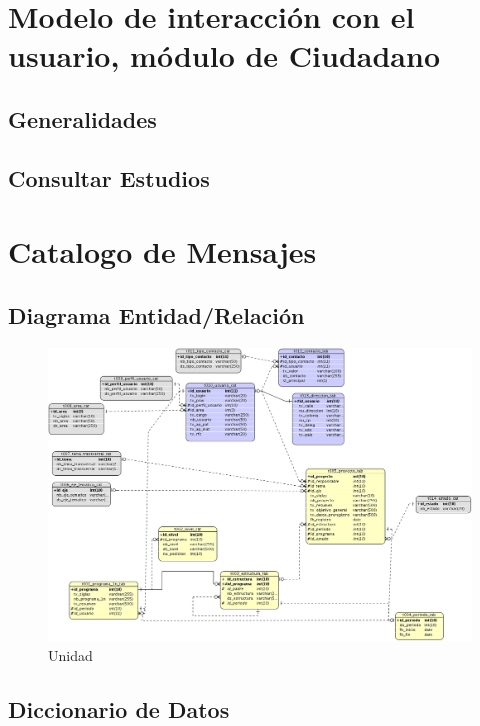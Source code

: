 \documentclass[10pt]{book}
\begin{document}

\chapter{Modelo de interacción con el usuario, módulo de Ciudadano}
\section{Generalidades}

\section{Consultar Estudios}

\chapter{Catalogo de Mensajes} 


\section{Diagrama Entidad/Relación}

  	\begin{figure}[h!]
 		\centering
 			\includegraphics[width=.8\textwidth]{images/modeloER.jpg}
 		\caption{Unidad}
 	\end{figure}

\section{Diccionario de Datos}

\end{document}
